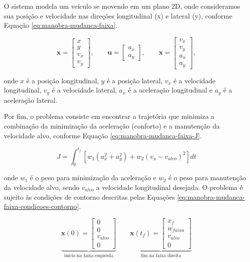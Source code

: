 O sistema modela um veículo se movendo em um plano 2D, onde consideramos sua posição e velocidade nas direções longitudinal (x) e lateral (y), conforme Equação \ref{eq:manobra-mudanca-faixa}.

\begin{equation}
    \mathbf{x} = \begin{bmatrix}
        x \\
        y \\
        v_x \\
        v_y
    \end{bmatrix},
    \qquad
    \mathbf{u} = \begin{bmatrix}
        a_x \\
        a_y
    \end{bmatrix},
    \qquad
    \dot{\mathbf{x}} = \begin{bmatrix}
        v_x \\
        v_y \\
        a_x \\
        a_y
    \end{bmatrix},
    \label{eq:manobra-mudanca-faixa}
\end{equation}

\noindent onde $x$ é a posição longitudinal, $y$ é a posição lateral, $v_x$ é a velocidade longitudinal, $v_y$ é a velocidade lateral, $a_x$ é a aceleração longitudinal e $a_y$ é a aceleração lateral.

Por fim, o problema consiste em encontrar a trajetória que minimiza a combinação da minimização da aceleração (conforto) e a manutenção da velocidade alvo, conforme Equação \ref{eq:manobra-mudanca-faixa-J}.

\begin{equation}
    J = \int_0^{t_f} \left[w_1(a_x^2 + a_y^2) + w_2(v_x - v_{alvo})^2\right] dt
    \label{eq:manobra-mudanca-faixa-J}
\end{equation}

\noindent onde $w_1$ é o peso para minimização da aceleração e $w_2$ é o peso para manutenção da velocidade alvo, sendo $v_{alvo}$ a velocidade longitudinal desejada. O problema é sujeito às condições de contorno descritas pelas Equações \ref{eq:manobra-mudanca-faixa-condicoes-contorno}.

\begin{equation}
    \underbrace{\mathbf{x}(0) = \begin{bmatrix} 0 \\ 0 \\ v_{alvo} \\ 0 \end{bmatrix}}_{\text{início na faixa esquerda}}
    \qquad
    \underbrace{\mathbf{x}(t_f) = \begin{bmatrix} x_f \\ w_{faixa} \\ v_{alvo} \\ 0 \end{bmatrix}}_{\text{fim na faixa direita}}
    \label{eq:manobra-mudanca-faixa-condicoes-contorno}
\end{equation}

